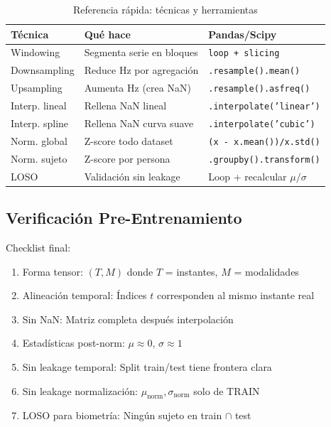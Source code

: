 \documentclass[11pt,twoside,a4paper]{article}
\newcommand{\code}[1]{\texttt{\small #1}}
\begin{document}
\begin{table}[H]
\centering
\caption{Referencia rápida: técnicas y herramientas}
\label{tab:resumen_all}
\begin{tabular}{|l|l|l|}
\hline
\textbf{Técnica} & \textbf{Qué hace} & \textbf{Pandas/Scipy} \\
\hline
Windowing & Segmenta serie en bloques & \code{loop + slicing} \\
\hline
Downsampling & Reduce Hz por agregación & \code{.resample().mean()} \\
\hline
Upsampling & Aumenta Hz (crea NaN) & \code{.resample().asfreq()} \\
\hline
Interp. lineal & Rellena NaN lineal & \code{.interpolate('linear')} \\
\hline
Interp. spline & Rellena NaN curva suave & \code{.interpolate('cubic')} \\
\hline
Norm. global & Z-score todo dataset & \code{(x - x.mean())/x.std()} \\
\hline
Norm. sujeto & Z-score por persona & \code{.groupby().transform()} \\
\hline
LOSO & Validación sin leakage & Loop + recalcular $\mu/\sigma$ \\
\hline
\end{tabular}
\end{table}

\subsection{Verificación Pre-Entrenamiento}

Checklist final:

\begin{enumerate}
    \item Forma tensor: $(T, M)$ donde $T$ = instantes, $M$ = modalidades
    \item Alineación temporal: Índices $t$ corresponden al mismo instante real
    \item Sin NaN: Matriz completa después interpolación
    \item Estadísticas post-norm: $\mu \approx 0$, $\sigma \approx 1$
    \item Sin leakage temporal: Split train/test tiene frontera clara
    \item Sin leakage normalización: $\mu_{\text{norm}}, \sigma_{\text{norm}}$ solo de TRAIN
    \item LOSO para biometría: Ningún sujeto en train $\cap$ test
\end{enumerate}
\end{document}
